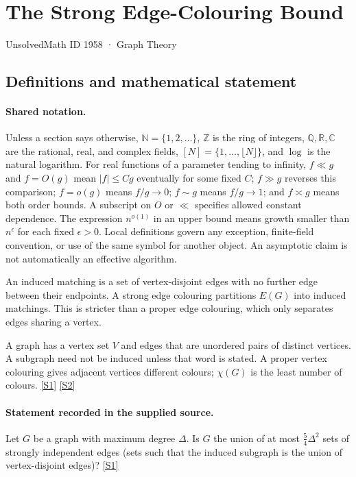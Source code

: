 \documentclass[11pt,a4paper]{article}
\newcommand{\N}{\mathbb{N}}
\newcommand{\Z}{\mathbb{Z}}
\newcommand{\Q}{\mathbb{Q}}
\newcommand{\R}{\mathbb{R}}
\newcommand{\C}{\mathbb{C}}
\newcommand{\sref}[2]{\hyperlink{source:#1:#2}{[S#2]}}
\begin{document}

\setcounter{section}{1957}

\section{The Strong Edge-Colouring Bound}\label{1958}

{\small\sffamily UnsolvedMath ID 1958 · Graph Theory}

\subsection{Definitions and mathematical statement}

\paragraph{Shared notation.}Unless a section says otherwise, $\N=\{1,2,\ldots\}$,
$\Z$ is the ring of integers, $\Q,\R,\C$ are the rational, real, and complex
fields, $[N]=\{1,\ldots,\lfloor N\rfloor\}$, and $\log$ is the natural
logarithm. For real functions of a parameter tending to infinity,
$f\ll g$ and $f=O(g)$ mean $|f|\leq Cg$ eventually for some fixed $C$;
$f\gg g$ reverses this comparison; $f=o(g)$ means $f/g\to0$;
$f\sim g$ means $f/g\to1$; and $f\asymp g$ means both order bounds.
A subscript on $O$ or $\ll$ specifies allowed constant dependence.
The expression $n^{o(1)}$ in an upper bound means growth smaller than
$n^\epsilon$ for each fixed $\epsilon>0$. Local definitions govern any
exception, finite-field convention, or use of the same symbol for another
object. An asymptotic claim is not automatically an effective algorithm.



An induced matching is a set of vertex-disjoint edges with no further edge between their endpoints. A strong edge colouring partitions $E(G)$ into induced matchings. This is stricter than a proper edge colouring, which only separates edges sharing a vertex.

A graph has a vertex set $V$ and edges that are unordered pairs of distinct vertices. A subgraph need not be induced unless that word is stated. A proper vertex colouring gives adjacent vertices different colours; $\chi(G)$ is the least number of colours. \sref{1958}{1} \sref{1958}{2}

\paragraph{Statement recorded in the supplied source.}
Let $G$ be a graph with maximum degree $\Delta$. Is $G$ the union of at most $\tfrac{5}{4}\Delta^2$ sets of strongly independent edges (sets such that the induced subgraph is the union of vertex-disjoint edges)? \sref{1958}{1}
\end{document}
